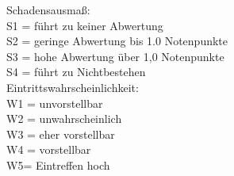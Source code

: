 Schadensausmaß: \\
S1 = führt zu keiner Abwertung \\
S2 = geringe Abwertung bis 1.0 Notenpunkte \\
S3 = hohe Abwertung über 1,0 Notenpunkte \\
S4 = führt zu Nichtbestehen \\
\newline
Eintrittswahrscheinlichkeit: \\
W1 = unvorstellbar \\
W2 = unwahrscheinlich \\
W3 = eher vorstellbar \\
W4 = vorstellbar \\
W5= Eintreffen hoch \\

\restoregeometry
\riskvalues
\newpage
